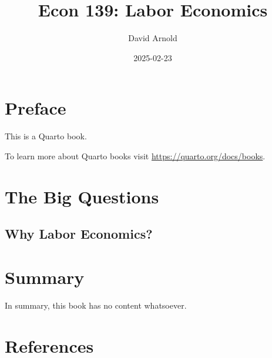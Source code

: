 \documentclass[
  letterpaper,
  DIV=11,
  numbers=noendperiod]{scrreprt}
\title{Econ 139: Labor Economics}
\author{David Arnold}
\date{2025-02-23}
\newlength{\cslhangindent}
\newenvironment{CSLReferences}[2] %
 {\begin{list}{}{%
  \setlength{\itemindent}{0pt}
  \setlength{\leftmargin}{0pt}
  \setlength{\parsep}{0pt}
  \ifodd #1
   \setlength{\leftmargin}{\cslhangindent}
   \setlength{\itemindent}{-1\cslhangindent}
  \fi
  \setlength{\itemsep}{#2\baselineskip}}}
 {\end{list}}
\renewcommand*\contentsname{Table of contents}
\newcommand\contentsname{Table of contents}
\begin{document}
\maketitle

\renewcommand*\contentsname{Table of contents}
{
\hypersetup{linkcolor=}
\setcounter{tocdepth}{2}
\tableofcontents
}


\chapter*{Preface}\label{preface}


This is a Quarto book.

To learn more about Quarto books visit
\url{https://quarto.org/docs/books}.


\chapter{The Big Questions}\label{the-big-questions}

\section{Why Labor Economics?}\label{why-labor-economics}


\chapter{Summary}\label{summary}

In summary, this book has no content whatsoever.


\chapter*{References}\label{references}


\label{refs}
\begin{CSLReferences}{0}{1}
\end{CSLReferences}
\end{document}
